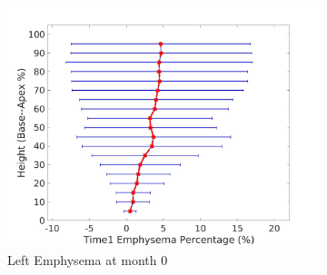 \begin{figure}[H]
\begin{subfigure}{.42\linewidth}
  \includegraphics[width=\linewidth,trim={{.0\wd0} {.0\wd0} {.0\wd0} {.0\wd0}},clip]{QuantitativeAnalysis/Image/LeftLungEmphysemaDiseaseAgainstHeightTime1.jpg} %
  \caption{Left Emphysema at month 0}
  \label{fig:DiseaseAgainstHeightTime1-g} 
\end{subfigure} 
\begin{subfigure}{.42\linewidth}%

\end{subfigure}
\end{figure}
